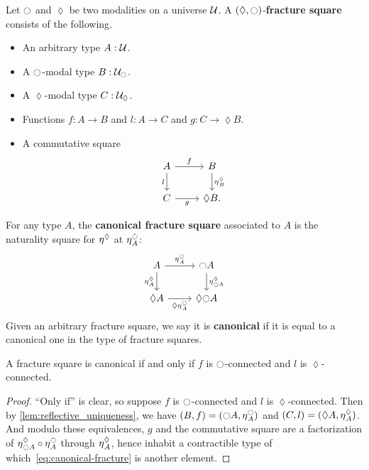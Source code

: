 \begin{defn}
  Let ${\ocircle}$ and $\lozenge$ be two modalities on a universe $\mathcal{U}$.
  A $(\lozenge,{\ocircle})$-\textbf{fracture square} consists of the following.
  \begin{itemize}
  \item An arbitrary type $A:\mathcal{U}$.
  \item A ${\ocircle}$-modal type $B:\mathcal{U}_{\ocircle}$.
  \item A $\lozenge$-modal type $C:\mathcal{U}_\lozenge$.
  \item Functions $f:A\to B$ and $l:A\to C$ and $g:C\to \lozenge B$.
  \item A commutative square
    \[
    \begin{tikzcd}
      A \ar[r,"f"] \ar[d,"l"'] & B \ar[d,"{\modalunit^\lozenge_B}"] \\
      C \ar[r,"g"'] & \lozenge B.
    \end{tikzcd}
    \]
  \end{itemize}
  For any type $A$, the \textbf{canonical fracture square} associated to $A$ is the naturality square for ${\eta_{}}^\lozenge$ at ${\eta_{}}^{\ocircle}_A$:
  \begin{equation}
    \begin{tikzcd}
      A \ar[r,"\modalunit^\modal_A"] \ar[d,"\modalunit^\lozenge_A"'] & \modal A \ar[d,"{\modalunit^\lozenge_{\modal A}}"] \\
      \lozenge A \ar[r,"{\lozenge \modalunit^\modal_A}"'] & \lozenge \modal A
    \end{tikzcd}\label{eq:canonical-fracture}
  \end{equation}
  Given an arbitrary fracture square, we say it is \textbf{canonical} if it is equal to a canonical one in the type of fracture squares.
\end{defn}

\begin{lem}\label{thm:canonical-fracture}
  A fracture square is canonical if and only if $f$ is ${\ocircle}$-connected and $l$ is $\lozenge$-connected.
\end{lem}
\begin{proof}
  ``Only if'' is clear, so suppose $f$ is ${\ocircle}$-connected and $l$ is $\lozenge$-connected.
  Then by \cref{lem:reflective_uniqueness}, we have $(B,f) = ({\ocircle} A,{\eta_{}}^{\ocircle}_A)$ and $(C,l) = (\lozenge A,{\eta_{}}^\lozenge_A)$.
  And modulo these equivalences, $g$ and the commutative square are a factorization of ${\eta_{}}^\lozenge_{{\ocircle} A} \circ {\eta_{}}^{\ocircle}_A$ through ${\eta_{}}^\lozenge_A$, hence inhabit a contractible type of which~\eqref{eq:canonical-fracture} is another element.
\end{proof}

